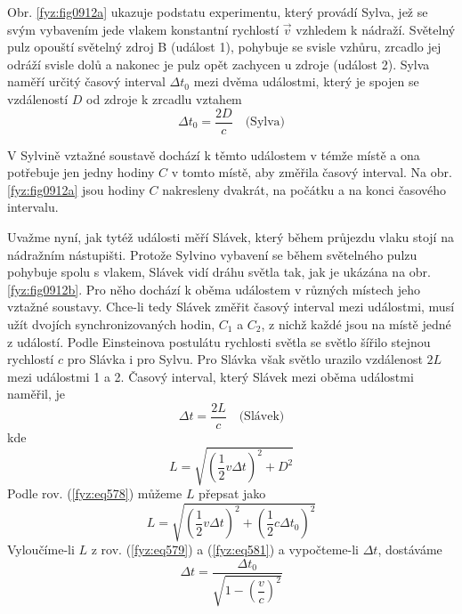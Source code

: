     Obr. \ref{fyz:fig0912a} ukazuje podstatu experimentu, který provádí Sylva, jež se svým vybavením
    jede vlakem konstantní rychlostí \(\vec{v}\) vzhledem k nádraží. Světelný pulz opouští světelný
    zdroj B (událost 1), pohybuje se svisle vzhůru, zrcadlo jej odráží svisle dolů a nakonec je pulz
    opět zachycen u zdroje (událost 2). Sylva naměří určitý časový interval \(\Delta t_0\) mezi
    dvěma událostmi, který je spojen se vzdáleností \(D\) od zdroje k zrcadlu vztahem
    \begin{equation}\label{fyz:eq578}
      \Delta t_0 = \frac{2D}{c} \quad \text{(Sylva)}
    \end{equation}

    V Sylvině vztažné soustavě dochází k těmto událostem v témže místě a ona potřebuje jen jedny
    hodiny \(C\) v tomto místě, aby změřila časový interval. Na obr.\ref{fyz:fig0912a} jsou hodiny
    \(C\) nakresleny dvakrát, na počátku a na konci časového intervalu.

    Uvažme nyní, jak tytéž události měří Slávek, který během průjezdu vlaku stojí na nádražním
    nástupišti. Protože Sylvino vybavení se během světelného pulzu pohybuje spolu s vlakem, Slávek
    vidí dráhu světla tak, jak je ukázána na obr. \ref{fyz:fig0912b}. Pro něho dochází k oběma
    událostem v různých místech jeho vztažné soustavy. Chce-li tedy Slávek změřit časový interval
    mezi událostmi, musí užít dvojích synchronizovaných hodin, \(C_1\) a \(C_2\), z nichž každé jsou
    na místě jedné z událostí. Podle Einsteinova postulátu rychlosti světla se světlo šířilo stejnou
    rychlostí \(c\) pro Slávka i pro Sylvu. Pro Slávka však světlo urazilo vzdálenost \(2L\) mezi
    událostmi 1 a 2. Časový interval, který Slávek mezi oběma událostmi naměřil, je
    \begin{equation}\label{fyz:eq579}
      \Delta t = \frac{2L}{c} \quad \text{(Slávek)}
    \end{equation}
    kde
    \begin{equation}\label{fyz:eq580}
      L = \sqrt{(\frac{1}{2}v\Delta t)^2 + D^2}
    \end{equation}
    Podle rov. (\ref{fyz:eq578}) můžeme \(L\) přepsat jako
    \begin{equation}\label{fyz:eq581}
      L = \sqrt{(\frac{1}{2}v\Delta t)^2 + (\frac{1}{2}c\Delta t_0)^2}
    \end{equation}
    Vyloučíme-li \(L\) z rov. (\ref{fyz:eq579}) a (\ref{fyz:eq581}) a vypočteme-li \(\Delta t\),
    dostáváme
    \begin{equation}\label{fyz:eq582}
      \boxed{\Delta t = \dfrac{\Delta t_0}{\sqrt{1  - \left(\dfrac{v}{c}\right)^2}}}
    \end{equation}

